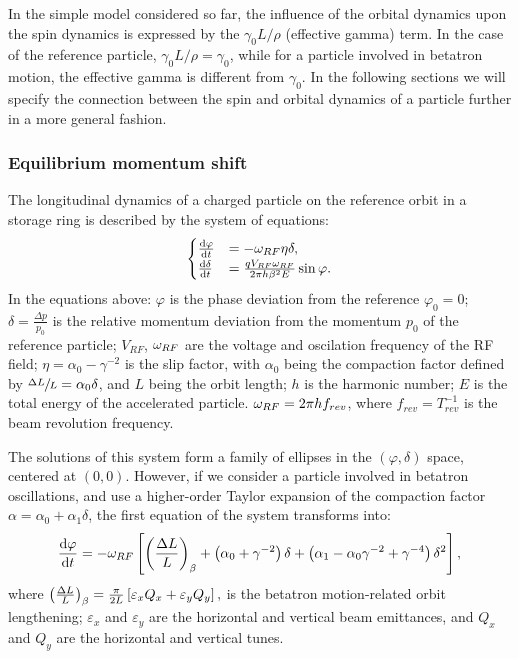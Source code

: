 \documentclass{article}
\begin{document}
In the simple model considered so far, the influence of the orbital dynamics upon the spin dynamics is expressed by the $\gamma_0 L/\rho$ (effective gamma) term. In the case of the reference particle, $\gamma_0L/\rho = \gamma_0$, while for a particle involved in betatron motion, the effective gamma is different from $\gamma_0$. In the following sections we will specify the connection between the spin and orbital dynamics of a particle further in a more general fashion.

\subsubsection{Equilibrium momentum shift}
The longitudinal dynamics of a charged particle on the reference orbit in a storage ring is described by the system of equations:
\begin{equation*}
  \begin{cases}
    \frac{\mathrm{d} {\varphi}}{\mathrm{d} t} &= -\omega_{RF}\eta\delta, \\
    \frac{\mathrm{d} {\delta}}{\mathrm{d} t} &= \frac{q V_{RF}\omega_{RF}}{2\pi h\beta^2E}\sin\varphi.
  \end{cases}
\end{equation*}
In the equations above: $\varphi$ is the phase deviation from the reference $\varphi_0 = 0$; $\delta = \frac{\Delta p}{p_0}$ is the relative momentum deviation from the momentum $p_0$ of the reference particle; $V_{RF}$, $\omega_{RF}$ are the voltage and oscilation frequency of the RF field; $\eta = \alpha_0 - \gamma^{-2}$ is the slip factor, with $\alpha_0$ being the compaction factor defined by $\sfrac{\Delta L}{L} = \alpha_0\delta$, and $L$ being the orbit length; $h$ is the harmonic number; $E$ is the total energy of the accelerated particle. $\omega_{RF} = 2\pi h f_{rev}$, where $f_{rev}=T_{rev}^{-1}$ is the beam revolution frequency.

The solutions of this system form a family of ellipses in the $(\varphi, \delta)$ space, centered at $(0,0)$. However, if we consider a particle involved in betatron oscillations, and use a higher-order Taylor expansion of the compaction factor $\alpha = \alpha_0 + \alpha_1\delta$, the first equation of the system transforms into:~\citep[p.~2579]{Senichev:IPAC13}
\[
\ddt{\varphi} = -\w_{RF} \bkt*{\bkt{\frac{\Delta L}{L}}_\beta + \bkt{\alpha_0 + \gamma^{-2}}\delta + \bkt{\alpha_1 - \alpha_0\gamma^{-2} + \gamma^{-4}}\delta^2},
\]
where $\bkt{\frac{\Delta L}{L}}_\beta = \frac{\pi}{2L}\bkt*{\varepsilon_xQ_x + \varepsilon_yQ_y},$ is the betatron motion-related orbit lengthening; $\varepsilon_x$ and $\varepsilon_y$ are the horizontal and vertical beam emittances, and $Q_x$ and $Q_y$ are the horizontal and vertical tunes.~\citep[p.~2580]{Senichev:IPAC13}
\end{document}
